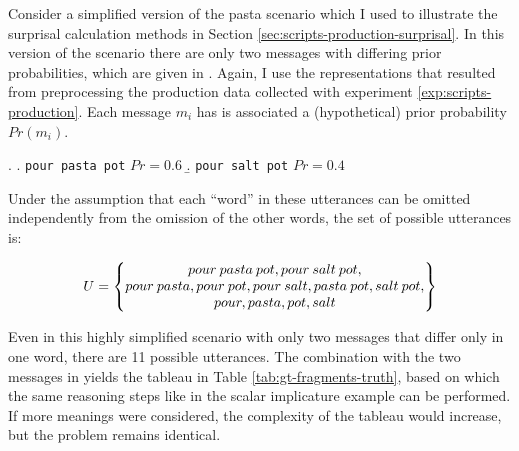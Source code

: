 Consider a simplified version of the pasta scenario which I used to illustrate the surprisal calculation methods in Section \ref{sec:scripts-production-surprisal}. In this version of the scenario there are only two messages with differing prior probabilities, which are given in \Next. Again, I use the representations that resulted from preprocessing the production data collected with experiment \ref{exp:scripts-production}. Each message $m_i$ has is associated a (hypothetical) prior probability $Pr(m_i)$.

\ex. \a. \texttt{pour pasta pot} \hfill $Pr = 0.6$
     \b. \texttt{pour salt pot} \hfill $Pr = 0.4$

Under the assumption that each ``word'' in these utterances can be omitted independently from the omission of the other words, the set of possible utterances is:

\begin{equation}
 U = \begin{Bmatrix}
       pour \: pasta \: pot, pour \: salt \: pot,\\
       pour \: pasta, pour \: pot, pour \: salt, pasta \: pot, salt \: pot,\\
       pour, pasta, pot, salt
      \end{Bmatrix}
\end{equation}

Even in this highly simplified scenario with only two messages that differ only in one word, there are 11 possible utterances. The combination with the two messages in \Last yields the tableau in Table \ref{tab:gt-fragments-truth}, based on which the same reasoning steps like in the scalar implicature example can be performed. If more meanings were considered, the complexity of the tableau would increase, but the problem remains identical.

